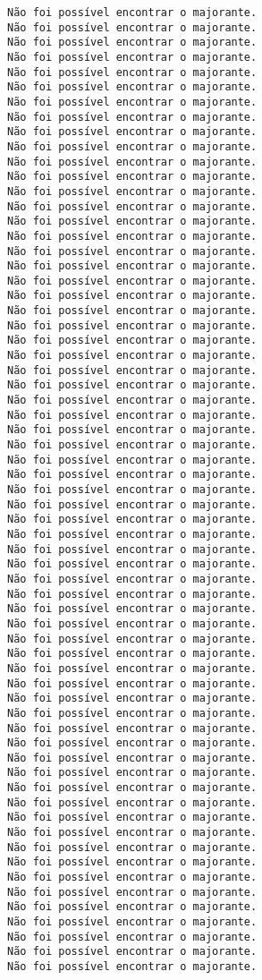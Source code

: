 \documentclass[11pt]{article}
\begin{document}
\begin{Verbatim}[commandchars=\\\{\}]
Não foi possível encontrar o majorante.
Não foi possível encontrar o majorante.
Não foi possível encontrar o majorante.
Não foi possível encontrar o majorante.
Não foi possível encontrar o majorante.
Não foi possível encontrar o majorante.
Não foi possível encontrar o majorante.
Não foi possível encontrar o majorante.
Não foi possível encontrar o majorante.
Não foi possível encontrar o majorante.
Não foi possível encontrar o majorante.
Não foi possível encontrar o majorante.
Não foi possível encontrar o majorante.
Não foi possível encontrar o majorante.
Não foi possível encontrar o majorante.
Não foi possível encontrar o majorante.
Não foi possível encontrar o majorante.
Não foi possível encontrar o majorante.
Não foi possível encontrar o majorante.
Não foi possível encontrar o majorante.
Não foi possível encontrar o majorante.
Não foi possível encontrar o majorante.
Não foi possível encontrar o majorante.
Não foi possível encontrar o majorante.
Não foi possível encontrar o majorante.
Não foi possível encontrar o majorante.
Não foi possível encontrar o majorante.
Não foi possível encontrar o majorante.
Não foi possível encontrar o majorante.
Não foi possível encontrar o majorante.
Não foi possível encontrar o majorante.
Não foi possível encontrar o majorante.
Não foi possível encontrar o majorante.
Não foi possível encontrar o majorante.
Não foi possível encontrar o majorante.
Não foi possível encontrar o majorante.
Não foi possível encontrar o majorante.
Não foi possível encontrar o majorante.
Não foi possível encontrar o majorante.
Não foi possível encontrar o majorante.
Não foi possível encontrar o majorante.
Não foi possível encontrar o majorante.
Não foi possível encontrar o majorante.
Não foi possível encontrar o majorante.
Não foi possível encontrar o majorante.
Não foi possível encontrar o majorante.
Não foi possível encontrar o majorante.
Não foi possível encontrar o majorante.
Não foi possível encontrar o majorante.
Não foi possível encontrar o majorante.
Não foi possível encontrar o majorante.
Não foi possível encontrar o majorante.
Não foi possível encontrar o majorante.
Não foi possível encontrar o majorante.
Não foi possível encontrar o majorante.
Não foi possível encontrar o majorante.
Não foi possível encontrar o majorante.
Não foi possível encontrar o majorante.
Não foi possível encontrar o majorante.
Não foi possível encontrar o majorante.
Não foi possível encontrar o majorante.
Não foi possível encontrar o majorante.
Não foi possível encontrar o majorante.
Não foi possível encontrar o majorante.
Não foi possível encontrar o majorante.

\end{Verbatim}
\end{document}
